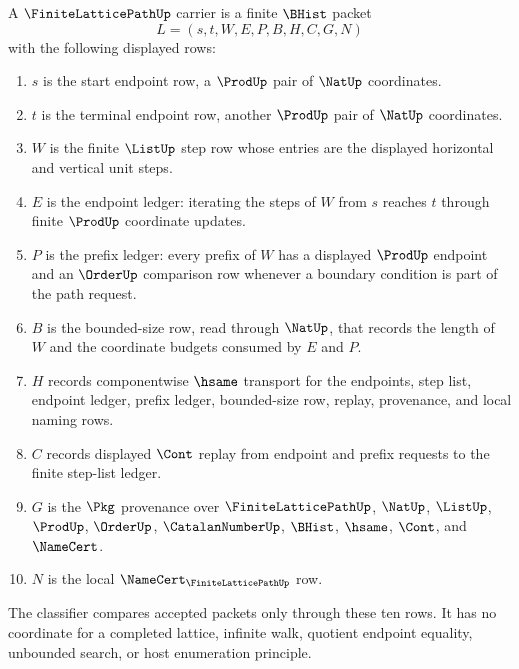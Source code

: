 \begin{definition}
\label{def:finite-lattice-path-carrier}
A $\FiniteLatticePathUp$ carrier is a finite $\BHist$ packet
$$
L=(s,t,W,E,P,B,H,C,G,N)
$$
with the following displayed rows:
\begin{enumerate}
\item $s$ is the start endpoint row, a $\ProdUp$ pair of $\NatUp$ coordinates.
\item $t$ is the terminal endpoint row, another $\ProdUp$ pair of $\NatUp$ coordinates.
\item $W$ is the finite $\ListUp$ step row whose entries are the displayed horizontal and vertical unit steps.
\item $E$ is the endpoint ledger: iterating the steps of $W$ from $s$ reaches $t$ through finite $\ProdUp$ coordinate updates.
\item $P$ is the prefix ledger: every prefix of $W$ has a displayed $\ProdUp$ endpoint and an $\OrderUp$ comparison row whenever a boundary condition is part of the path request.
\item $B$ is the bounded-size row, read through $\NatUp$, that records the length of $W$ and the coordinate budgets consumed by $E$ and $P$.
\item $H$ records componentwise $\hsame$ transport for the endpoints, step list, endpoint ledger, prefix ledger, bounded-size row, replay, provenance, and local naming rows.
\item $C$ records displayed $\Cont$ replay from endpoint and prefix requests to the finite step-list ledger.
\item $G$ is the $\Pkg$ provenance over $\FiniteLatticePathUp$, $\NatUp$, $\ListUp$, $\ProdUp$, $\OrderUp$, $\CatalanNumberUp$, $\BHist$, $\hsame$, $\Cont$, and $\NameCert$.
\item $N$ is the local $\NameCert_{\FiniteLatticePathUp}$ row.
\end{enumerate}
The classifier compares accepted packets only through these ten rows. It has no coordinate for a completed lattice, infinite walk, quotient endpoint equality, unbounded search, or host enumeration principle.
\end{definition}

